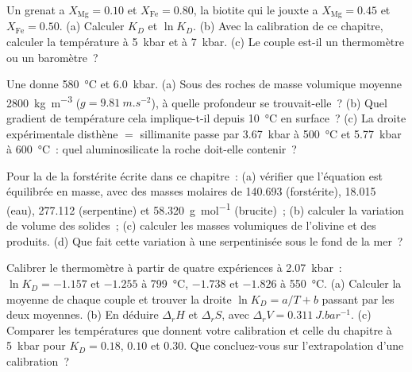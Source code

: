 \begin{exercise}[$\star$]\label{exo:b2:pt-paths:2}
Un grenat a $X_{\text{Mg}} = 0.10$ et $X_{\text{Fe}} = 0.80$, la biotite qui le jouxte
a $X_{\text{Mg}} = 0.45$ et $X_{\text{Fe}} = 0.50$. (a) Calculer $K_D$ et $\ln K_D$.
(b) Avec la calibration de ce chapitre, calculer la température à \qty{5}{kbar} et à
\qty{7}{kbar}. (c) Le couple est-il un thermomètre ou un baromètre~?
\end{exercise}

\begin{exercise}[$\star$]\label{exo:b2:pt-paths:3}
Une  donne \qty{580}{\celsius} et \qty{6.0}{kbar}. (a) Sous des roches de masse volumique
moyenne \qty{2800}{kg.m^{-3}} ($g = \qty{9.81}{m.s^{-2}}$), à quelle profondeur se trouvait-elle~? (b) Quel
gradient de température cela implique-t-il depuis \qty{10}{\celsius} en surface~? (c) La
droite expérimentale disthène $=$ sillimanite passe par \qty{3.67}{kbar} à
\qty{500}{\celsius} et \qty{5.77}{kbar} à \qty{600}{\celsius}~: quel aluminosilicate
la roche doit-elle contenir~?
\end{exercise}

\begin{exercise}[$\star$]\label{exo:b2:pt-paths:4}
Pour la  de la forstérite écrite dans ce chapitre~: (a) vérifier que l'équation
est équilibrée en masse, avec des masses molaires de 140.693 (forstérite), 18.015 (eau),
277.112 (serpentine) et \qty{58.320}{g.mol^{-1}} (brucite)~; (b) calculer la variation de
volume des solides~; (c) calculer les masses volumiques de l'olivine et des produits.
(d) Que fait cette variation à une  serpentinisée sous le fond de la mer~?
\end{exercise}

\begin{exercise}[$\star\star$]\label{exo:b2:pt-paths:5}
Calibrer le thermomètre à partir de quatre expériences à \qty{2.07}{kbar}~: $\ln K_D =
-1.157$ et $-1.255$ à \qty{799}{\celsius}, $-1.738$ et $-1.826$ à \qty{550}{\celsius}.
(a) Calculer la moyenne de chaque couple et trouver la droite $\ln K_D = a/T + b$ passant par les deux moyennes.
(b) En déduire $\Delta_r H$ et $\Delta_r S$, avec $\Delta_r V = \qty{0.311}{J.bar^{-1}}$.
(c) Comparer les températures que donnent votre calibration et celle du chapitre à
\qty{5}{kbar} pour $K_D = 0.18$, $0.10$ et $0.30$. Que concluez-vous sur
l'extrapolation d'une calibration~?
\end{exercise}

